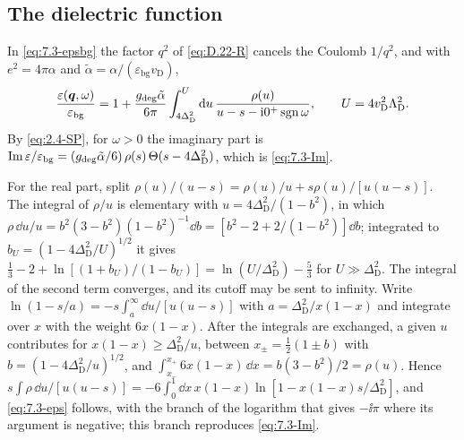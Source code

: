 \subsection*{The dielectric function}

In \cref{eq:7.3-epsbg} the factor $q^2$ of \cref{eq:D.22-R} cancels the Coulomb $1/q^2$, and with $e^2 = 4\pi\alpha$ and $\tilde\alpha = \alpha/(\varepsilon_{\mathrm{bg}}v_{\mathrm{D}})$,
\begin{equation*}
  \frac{\varepsilon(\bm{q},\omega)}{\varepsilon_{\mathrm{bg}}} = 1 + \frac{g_{\mathrm{deg}}\tilde\alpha}{6\pi}\int_{4\Delta_{\mathrm{D}}^2}^{U}\mathrm{d} u\,\frac{\rho(u)}{u - s - \mathrm{i}0^+\operatorname{sgn}\omega}, \qquad U = 4v_{\mathrm{D}}^2\Lambda_{\mathrm{D}}^2 .
\end{equation*}
By \cref{eq:2.4-SP}, for $\omega > 0$ the imaginary part is $\operatorname{Im}\varepsilon/\varepsilon_{\mathrm{bg}} = (g_{\mathrm{deg}}\tilde\alpha/6)\,\rho(s)\,\Theta(s - 4\Delta_{\mathrm{D}}^2)$, which is \cref{eq:7.3-Im}.

For the real part, split $\rho(u)/(u - s) = \rho(u)/u + s\rho(u)/[u(u - s)]$. The integral of $\rho/u$ is elementary with $u = 4\Delta_{\mathrm{D}}^2/(1 - b^2)$, in which $\rho\,\dd u/u = b^2(3 - b^2)(1 - b^2)^{-1}\dd b = [b^2 - 2 + 2/(1 - b^2)]\dd b$; integrated to $b_U = (1 - 4\Delta_{\mathrm{D}}^2/U)^{1/2}$ it gives $\frac13 - 2 + \ln[(1 + b_U)/(1 - b_U)] = \ln(U/\Delta_{\mathrm{D}}^2) - \frac53$ for $U \gg \Delta_{\mathrm{D}}^2$. The integral of the second term converges, and its cutoff may be sent to infinity. Write $\ln(1 - s/a) = -s\int_a^\infty\dd u/[u(u - s)]$ with $a = \Delta_{\mathrm{D}}^2/x(1 - x)$ and integrate over $x$ with the weight $6x(1 - x)$. After the integrals are exchanged, a given $u$ contributes for $x(1 - x) \ge \Delta_{\mathrm{D}}^2/u$, between $x_\pm = \frac12(1 \pm b)$ with $b = (1 - 4\Delta_{\mathrm{D}}^2/u)^{1/2}$, and $\int_{x_-}^{x_+}6x(1 - x)\,\dd x = b(3 - b^2)/2 = \rho(u)$. Hence $s\int\rho\,\dd u/[u(u - s)] = -6\int_0^1\dd x\,x(1 - x)\ln[1 - x(1 - x)s/\Delta_{\mathrm{D}}^2]$, and \cref{eq:7.3-eps} follows, with the branch of the logarithm that gives $-\ii\pi$ where its argument is negative; this branch reproduces \cref{eq:7.3-Im}.
